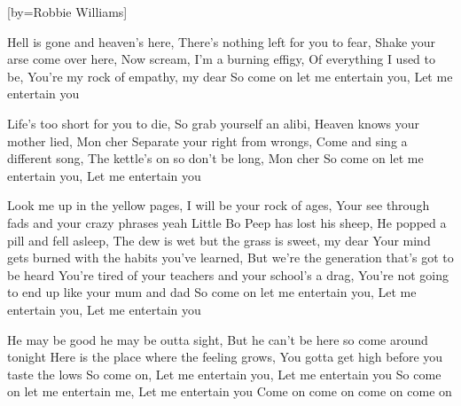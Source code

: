 

[by=Robbie Williams]

\begin{LARGE}


\beginverse
Hell is gone and heaven's here, There's nothing left for you to fear, Shake your arse come over here,
Now scream, I'm a burning effigy, Of everything I used to be, You're my rock of empathy, my dear
So come on let me entertain you, Let me entertain you
\endverse

\beginverse
Life's too short for you to die, So grab yourself an alibi, Heaven knows your mother lied, Mon cher
Separate your right from wrongs, Come and sing a different song, The kettle's on so don't be long, Mon cher
So come on let me entertain you, Let me entertain you
\endverse

\beginverse
Look me up in the yellow pages, I will be your rock of ages, Your see through fads and your crazy phrases yeah
Little Bo Peep has lost his sheep, He popped a pill and fell asleep, The dew is wet but the grass is sweet, my dear
Your mind gets burned with the habits you've learned, But we're the generation that's got to be heard
You're tired of your teachers and your school's a drag, You're not going to end up like your mum and dad
So come on let me entertain you, Let me entertain you, Let me entertain you
\endverse

\beginverse
He may be good he may be outta sight, But he can't be here so come around tonight
Here is the place where the feeling grows, You gotta get high before you taste the lows
So come on, Let me entertain you, Let me entertain you
So come on let me entertain me, Let me entertain you
Come on come on come on come on
\endverse


\end{LARGE}

\chordson
\endsong
